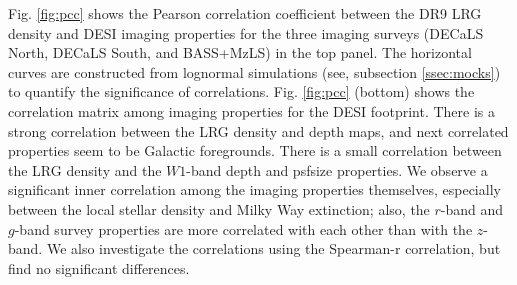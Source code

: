 Fig. \ref{fig:pcc} shows the Pearson correlation coefficient between the DR9 LRG density and DESI imaging properties for the three imaging surveys (DECaLS North, DECaLS South, and BASS+MzLS) in the top panel. The horizontal curves are constructed from lognormal simulations (see, subsection \ref{ssec:mocks}) to quantify the significance of correlations. Fig. \ref{fig:pcc} (bottom) shows the correlation matrix among imaging properties for the DESI footprint. There is a strong correlation between the LRG density and depth maps, and next correlated properties seem to be Galactic foregrounds. There is a small correlation between the LRG density and the $W1$-band depth and psfsize properties. We observe a significant inner correlation among the imaging properties themselves, especially between the local stellar density and Milky Way extinction; also, the $r$-band and $g$-band survey properties are more correlated with each other than with the $z$-band. We also investigate the correlations using the Spearman-r correlation, but find no significant differences.

